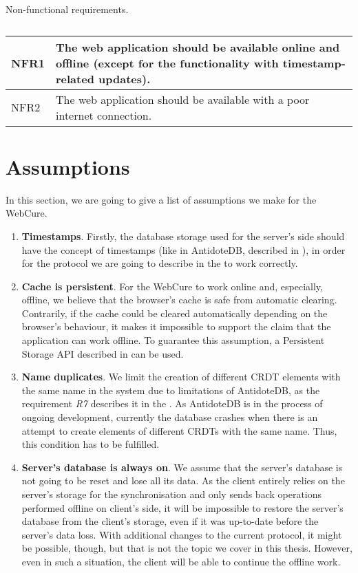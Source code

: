 \begin{table}[!htbp]
\centering
\caption{Non-functional requirements.}
\label{table:req2}
\begin{tabular}{|p{1cm}|p{14cm}|}
\hline
NFR1 & The web application should be available online and offline (except for the functionality with timestamp-related updates). \\ \hline
NFR2 & The web application should be available with a poor internet connection. \\ \hline
\end{tabular}
\caption*{}
\end{table}

\section{Assumptions}
\label{4-Assumptions}

In this section, we are going to give a list of assumptions we make for the WebCure. 

\begin{enumerate}
\item {\textbf{Timestamps}. Firstly, the database storage used for the server's side should have the concept of timestamps (like in AntidoteDB, described in ), in order for the protocol we are going to describe in the  to work correctly.}
\item {\textbf{Cache is persistent}. For the WebCure to work online and, especially, offline, we believe that the browser's cache is safe from automatic clearing. Contrarily, if the cache could be cleared automatically depending on the browser's behaviour, it makes it impossible to support the claim that the application can work offline. To guarantee this assumption, a Persistent Storage API described in  can be used.}
\item{\textbf{Name duplicates}. We limit the creation of different CRDT elements with the same name in the system due to limitations of AntidoteDB, as the requirement \textit{R7} describes it in the . As AntidoteDB is in the process of ongoing development, currently the database crashes when there is an attempt to create elements of different CRDTs with the same name. Thus, this condition has to be fulfilled.}
\item{\textbf{Server's database is always on}. We assume that the server's database is not going to be reset and lose all its data. As the client entirely relies on the server's storage for the synchronisation and only sends back operations performed offline on client's side, it will be impossible to restore the server's database from the client's storage, even if it was up-to-date before the server's data loss. With additional changes to the current protocol, it might be possible, though, but that is not the topic we cover in this thesis. However, even in such a situation, the client will be able to continue the offline work.}
\end{enumerate}

